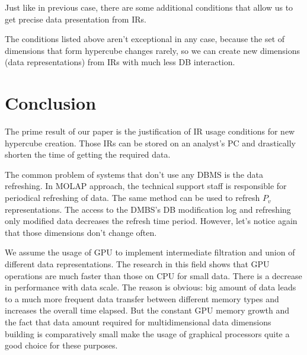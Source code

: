 \documentclass[10pt,a4paper]{article}
\begin{document}


Just like in previous case, there are some additional conditions that allow us to get precise data presentation from IRs.



The conditions listed above aren't exceptional in any case, because the set of dimensions that form hypercube changes rarely, so we can create new dimensions (data representations) from IRs with much less DB interaction.

\section{Conclusion}
The prime result of our paper is the justification of IR usage conditions for
new hypercube creation. Those IRs can be stored on an analyst's PC and
drastically shorten the time of getting the required data.

The common problem of systems that don't use any DBMS is the data refreshing. In
MOLAP approach, the technical support staff is responsible for periodical
refreshing of data. The same method can be used to refresh $P_v$
representations. The access to the DMBS's DB modification log and refreshing
only modified data decreases the refresh time period. However, let's notice
again that those dimensions don't change often.

We assume the usage of GPU to implement intermediate filtration and union of
different data representations. The research in this field shows that GPU
operations are much faster than those on CPU for small data. There is a decrease
in performance with data scale. The reason is obvious: big amount of data leads
to a much more frequent data transfer between different memory types and
increases the overall time elapsed. But the constant GPU memory growth and the
fact that data amount required for multidimensional data dimensions building is
comparatively small make the usage of graphical processors quite a good choice
for these purposes.


\end{document}
